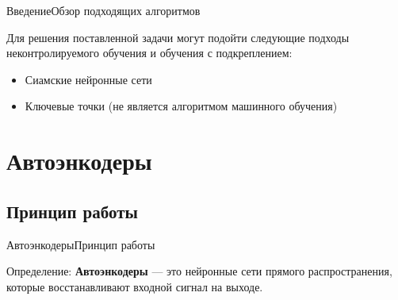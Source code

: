 \documentclass{beamer}
\begin{document}
\begin{frame}{Введение}{Обзор подходящих алгоритмов}

Для решения поставленной задачи могут подойти следующие подходы неконтролируемого обучения и обучения с подкреплением:
\begin{itemize}
	\item Сиамские нейронные сети
	\item Ключевые точки (не является алгоритмом машинного обучения)
\end{itemize}

\end{frame}

\section{Автоэнкодеры}

\subsection{Принцип работы}


\begin{frame}{Автоэнкодеры}{Принцип работы}

\begin{block}{Определение:}
	\textbf{Автоэнкодеры} --- это нейронные сети прямого распространения, которые восстанавливают входной сигнал на выходе.
\end{block}

\begin{figure}[h]
	\label{fig:ae}
\end{figure}

\end{frame}
\end{document}
